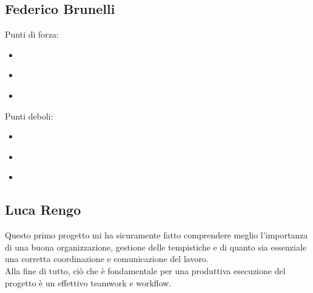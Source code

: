 
\subsection*{Federico Brunelli}

\textsf{\small }

\begin{flushleft}
	
	\textsf{\small Punti di forza:}\\
	
	\begin{itemize}
		\item \textsf{\small } %
		\item \textsf{\small }
		\item \textsf{\small }
	\end{itemize}
	
	\textsf{\small Punti deboli: }\\
	
	\begin{itemize}
		\item \textsf{\small } %
		\item \textsf{\small }
		\item \textsf{\small }
	\end{itemize}
	
\end{flushleft}


\subsection*{Luca Rengo}

\textsf{\small Questo primo progetto mi ha sicuramente fatto comprendere meglio l'importanza di una buona organizzazione, gestione delle tempistiche e di quanto sia essenziale una corretta coordinazione e comunicazione del lavoro.}\\
\textsf{\small Alla fine di tutto, ciò che è fondamentale per una produttiva esecuzione del progetto è un effettivo teamwork e workflow. } %

